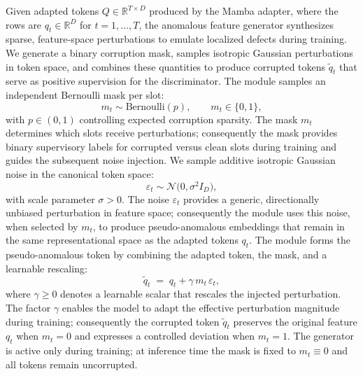 Given adapted tokens \(Q\in\mathbb{R}^{T\times D}\) produced by the Mamba adapter, where the rows are \(q_t\in\mathbb{R}^D\) for \(t=1,\dots,T\), the anomalous feature generator synthesizes sparse, feature-space perturbations to emulate localized defects during training. We generate a binary corruption mask, samples isotropic Gaussian perturbations in token space, and combines these quantities to produce corrupted tokens \(\tilde{q}_t\) that serve as positive supervision for the discriminator. The module samples an independent Bernoulli mask per slot:
\begin{equation}
m_t \sim \mathrm{Bernoulli}(p),\qquad m_t\in\{0,1\},
\end{equation}
with \(p\in(0,1)\) controlling expected corruption sparsity. The mask \(m_t\) determines which slots receive perturbations; consequently the mask provides binary supervisory labels for corrupted versus clean slots during training and guides the subsequent noise injection. We sample additive isotropic Gaussian noise in the canonical token space:
\begin{equation}
\varepsilon_t \sim \mathcal{N}\big(0,\sigma^2 I_D\big),
\end{equation}
with scale parameter \(\sigma>0\). The noise \(\varepsilon_t\) provides a generic, directionally unbiased perturbation in feature space; consequently the module uses this noise, when selected by \(m_t\), to produce pseudo-anomalous embeddings that remain in the same representational space as the adapted tokens \(q_t\). The module forms the pseudo-anomalous token by combining the adapted token, the mask, and a learnable rescaling:
\begin{equation}
\tilde{q}_t \;=\; q_t + \gamma\, m_t\, \varepsilon_t,
\end{equation}
where \(\gamma\ge 0\) denotes a learnable scalar that rescales the injected perturbation. The factor \(\gamma\) enables the model to adapt the effective perturbation magnitude during training; consequently the corrupted token \(\tilde{q}_t\) preserves the original feature \(q_t\) when \(m_t=0\) and expresses a controlled deviation when \(m_t=1\). The generator is active only during training; at inference time the mask is fixed to \(m_t\equiv 0\) and all tokens remain uncorrupted.

